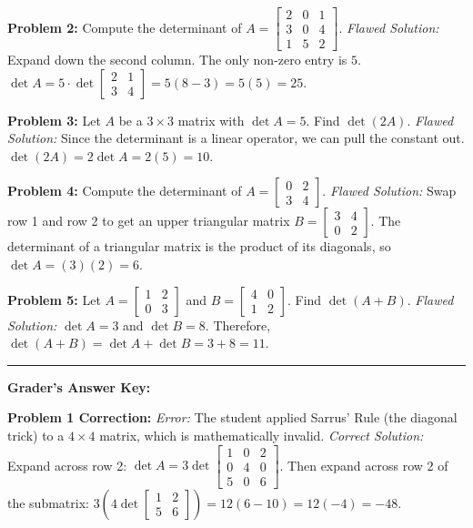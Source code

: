\documentclass{article}
\begin{document}
\textbf{Problem 2:} Compute the determinant of $A = \begin{bmatrix} 2 & 0 & 1 \\ 3 & 0 & 4 \\ 1 & 5 & 2 \end{bmatrix}$.
\newline \textit{Flawed Solution:} Expand down the second column. The only non-zero entry is $5$.
$\det A = 5 \cdot \det \begin{bmatrix} 2 & 1 \\ 3 & 4 \end{bmatrix} = 5(8 - 3) = 5(5) = 25$.

\textbf{Problem 3:} Let $A$ be a $3 \times 3$ matrix with $\det A = 5$. Find $\det(2A)$.
\newline \textit{Flawed Solution:} Since the determinant is a linear operator, we can pull the constant out. $\det(2A) = 2 \det A = 2(5) = 10$.

\textbf{Problem 4:} Compute the determinant of $A = \begin{bmatrix} 0 & 2 \\ 3 & 4 \end{bmatrix}$.
\newline \textit{Flawed Solution:} Swap row 1 and row 2 to get an upper triangular matrix $B = \begin{bmatrix} 3 & 4 \\ 0 & 2 \end{bmatrix}$. The determinant of a triangular matrix is the product of its diagonals, so $\det A = (3)(2) = 6$.

\textbf{Problem 5:} Let $A = \begin{bmatrix} 1 & 2 \\ 0 & 3 \end{bmatrix}$ and $B = \begin{bmatrix} 4 & 0 \\ 1 & 2 \end{bmatrix}$. Find $\det(A + B)$.
\newline \textit{Flawed Solution:} $\det A = 3$ and $\det B = 8$. Therefore, $\det(A + B) = \det A + \det B = 3 + 8 = 11$.

\vspace{0.5cm}
\hrule
\vspace{0.5cm}

\textbf{Grader's Answer Key:}

\textbf{Problem 1 Correction:}
\textit{Error:} The student applied Sarrus' Rule (the diagonal trick) to a $4 \times 4$ matrix, which is mathematically invalid.
\textit{Correct Solution:} Expand across row 2: $\det A = 3 \det \begin{bmatrix} 1 & 0 & 2 \\ 0 & 4 & 0 \\ 5 & 0 & 6 \end{bmatrix}$. Then expand across row 2 of the submatrix: $3(4 \det \begin{bmatrix} 1 & 2 \\ 5 & 6 \end{bmatrix}) = 12(6 - 10) = 12(-4) = -48$.
\end{document}
